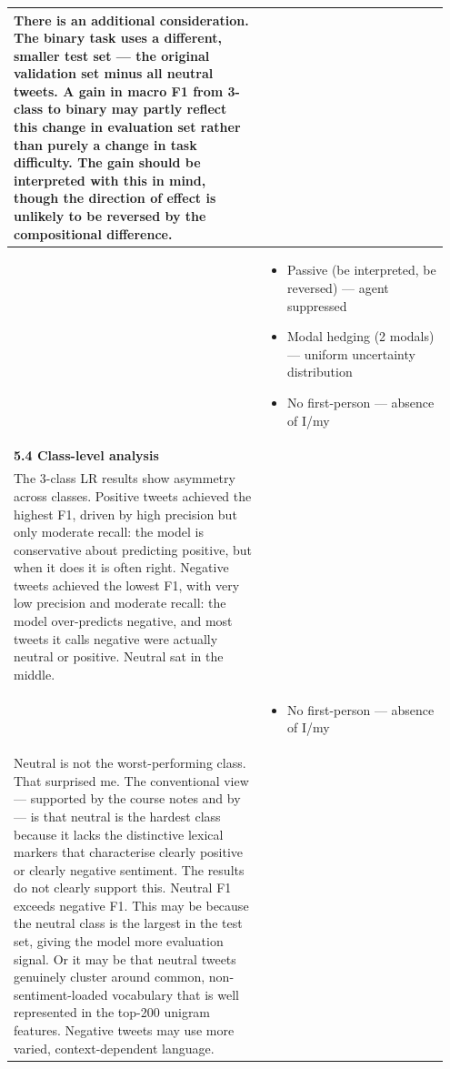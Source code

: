 \documentclass[11pt]{article}
\begin{document}
\begin{longtable}{|p{0.55\linewidth}|p{0.40\linewidth}|}
\hline
There is an additional consideration. The binary task uses a different, smaller test set --- the original validation set minus all neutral tweets. A gain in macro F1 from 3-class to binary may partly reflect this change in evaluation set rather than purely a change in task difficulty. The gain should be interpreted with this in mind, though the direction of effect is unlikely to be reversed by the compositional difference. & \\[2pt]
\hline
\rule[-3.5cm]{0pt}{3.5cm} & \begin{itemize}[leftmargin=1em,itemsep=1pt,topsep=1pt,parsep=0pt]
  \item Passive (be interpreted, be reversed) --- agent suppressed
  \item Modal hedging (2 modals) --- uniform uncertainty distribution
  \item No first-person --- absence of I/my
\end{itemize} \\
\hline
\textbf{5.4 Class-level analysis}\\[4pt]
The 3-class LR results show asymmetry across classes. Positive tweets achieved the highest F1, driven by high precision but only moderate recall: the model is conservative about predicting positive, but when it does it is often right. Negative tweets achieved the lowest F1, with very low precision and moderate recall: the model over-predicts negative, and most tweets it calls negative were actually neutral or positive. Neutral sat in the middle. & \\[2pt]
\hline
\rule[-3.5cm]{0pt}{3.5cm} & \begin{itemize}[leftmargin=1em,itemsep=1pt,topsep=1pt,parsep=0pt]
  \item No first-person --- absence of I/my
\end{itemize} \\
\hline
Neutral is not the worst-performing class. That surprised me. The conventional view --- supported by the course notes and by --- is that neutral is the hardest class because it lacks the distinctive lexical markers that characterise clearly positive or clearly negative sentiment. The results do not clearly support this. Neutral F1 exceeds negative F1. This may be because the neutral class is the largest in the test set, giving the model more evaluation signal. Or it may be that neutral tweets genuinely cluster around common, non-sentiment-loaded vocabulary that is well represented in the top-200 unigram features. Negative tweets may use more varied, context-dependent language. & \\[2pt]

\end{longtable}
\end{document}
